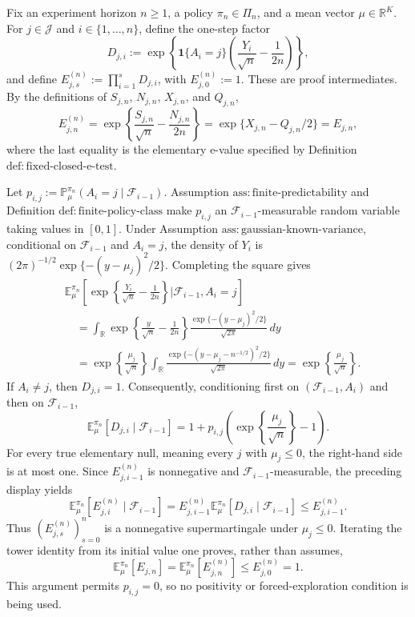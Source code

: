 Fix an experiment horizon \(n\geq 1\), a policy \(\pi_n\in\Pi_n\), and a mean vector \(\mu\in\mathbb R^K\).  For \(j\in\mathcal J\) and \(i\in\{1,\ldots,n\}\), define the one-step factor
\[
D_{j,i}:=\exp\!\left\{\mathbf 1\{A_i=j\}\left(\frac{Y_i}{\sqrt n}-\frac{1}{2n}\right)\right\},
\]
and define \(E^{(n)}_{j,s}:=\prod_{i=1}^sD_{j,i}\), with \(E^{(n)}_{j,0}:=1\).  These are proof intermediates.  By the definitions of \(S_{j,n}\), \(N_{j,n}\), \(X_{j,n}\), and \(Q_{j,n}\),
\[
E^{(n)}_{j,n}
=\exp\!\left\{\frac{S_{j,n}}{\sqrt n}-\frac{N_{j,n}}{2n}\right\}
=\exp\{X_{j,n}-Q_{j,n}/2\}
=E_{j,n},
\]
where the last equality is the elementary e-value specified by Definition \(\mathrm{def:fixed\text{-}closed\text{-}e\text{-}test}\).

Let \(p_{i,j}:=\mathbb P_\mu^{\pi_n}(A_i=j\mid\mathcal F_{i-1})\).  Assumption \(\mathrm{ass:finite\text{-}predictability}\) and Definition \(\mathrm{def:finite\text{-}policy\text{-}class}\) make \(p_{i,j}\) an \(\mathcal F_{i-1}\)-measurable random variable taking values in \([0,1]\).  Under Assumption \(\mathrm{ass:gaussian\text{-}known\text{-}variance}\), conditional on \(\mathcal F_{i-1}\) and \(A_i=j\), the density of \(Y_i\) is \((2\pi)^{-1/2}\exp\{-(y-\mu_j)^2/2\}\).  Completing the square gives
\[
\begin{aligned}
&\mathbb E_\mu^{\pi_n}\!\left[
 \exp\!\left\{\frac{Y_i}{\sqrt n}-\frac{1}{2n}\right\}
 \mathrel{\Big|}\mathcal F_{i-1},A_i=j
\right]\\
&\quad=\int_{\mathbb R}
 \exp\!\left\{\frac{y}{\sqrt n}-\frac{1}{2n}\right\}
 \frac{\exp\{-(y-\mu_j)^2/2\}}{\sqrt{2\pi}}\,dy\\
&\quad=\exp\!\left\{\frac{\mu_j}{\sqrt n}\right\}
 \int_{\mathbb R}\frac{\exp\{-(y-\mu_j-n^{-1/2})^2/2\}}{\sqrt{2\pi}}\,dy
=\exp\!\left\{\frac{\mu_j}{\sqrt n}\right\}.
\end{aligned}
\]
If \(A_i\neq j\), then \(D_{j,i}=1\).  Consequently, conditioning first on \((\mathcal F_{i-1},A_i)\) and then on \(\mathcal F_{i-1}\),
\[
\mathbb E_\mu^{\pi_n}[D_{j,i}\mid\mathcal F_{i-1}]
=1+p_{i,j}\left(\exp\!\left\{\frac{\mu_j}{\sqrt n}\right\}-1\right).
\]
For every true elementary null, meaning every \(j\) with \(\mu_j\leq0\), the right-hand side is at most one.  Since \(E^{(n)}_{j,i-1}\) is nonnegative and \(\mathcal F_{i-1}\)-measurable, the preceding display yields
\[
\mathbb E_\mu^{\pi_n}[E^{(n)}_{j,i}\mid\mathcal F_{i-1}]
=E^{(n)}_{j,i-1}\mathbb E_\mu^{\pi_n}[D_{j,i}\mid\mathcal F_{i-1}]
\leq E^{(n)}_{j,i-1}.
\]
Thus \((E^{(n)}_{j,s})_{s=0}^n\) is a nonnegative supermartingale under \(\mu_j\leq0\).  Iterating the tower identity from its initial value one proves, rather than assumes,
\[
\mathbb E_\mu^{\pi_n}[E_{j,n}]
=\mathbb E_\mu^{\pi_n}[E^{(n)}_{j,n}]
\leq E^{(n)}_{j,0}=1.
\]
This argument permits \(p_{i,j}=0\), so no positivity or forced-exploration condition is being used.

